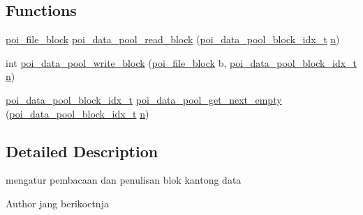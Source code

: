 \subsection*{Functions}
\begin{DoxyCompactItemize}
\item 
\hyperlink{structpoi__file__block}{poi\-\_\-file\-\_\-block} \hyperlink{data-pool-block-manager_8h_ac930ae4a4b3ca65a49d45c7654f15149}{poi\-\_\-data\-\_\-pool\-\_\-read\-\_\-block} (\hyperlink{data-pool-block-manager_8h_a87e19ab8290bcd76be1c7db1e90cc6f6}{poi\-\_\-data\-\_\-pool\-\_\-block\-\_\-idx\-\_\-t} \hyperlink{allocation-table-test_8c_a24010dade8ebab3f87a48022772cd975}{n})
\item 
int \hyperlink{data-pool-block-manager_8h_a10624f1cbc61dd0a8a03aa94d8502567}{poi\-\_\-data\-\_\-pool\-\_\-write\-\_\-block} (\hyperlink{structpoi__file__block}{poi\-\_\-file\-\_\-block} b, \hyperlink{data-pool-block-manager_8h_a87e19ab8290bcd76be1c7db1e90cc6f6}{poi\-\_\-data\-\_\-pool\-\_\-block\-\_\-idx\-\_\-t} \hyperlink{allocation-table-test_8c_a24010dade8ebab3f87a48022772cd975}{n})
\item 
\hyperlink{data-pool-block-manager_8h_a87e19ab8290bcd76be1c7db1e90cc6f6}{poi\-\_\-data\-\_\-pool\-\_\-block\-\_\-idx\-\_\-t} \hyperlink{data-pool-block-manager_8h_ae02f040d4e0f458f0d63751bc09f55b7}{poi\-\_\-data\-\_\-pool\-\_\-get\-\_\-next\-\_\-empty} (\hyperlink{data-pool-block-manager_8h_a87e19ab8290bcd76be1c7db1e90cc6f6}{poi\-\_\-data\-\_\-pool\-\_\-block\-\_\-idx\-\_\-t} \hyperlink{allocation-table-test_8c_a24010dade8ebab3f87a48022772cd975}{n})
\end{DoxyCompactItemize}


\subsection{Detailed Description}
mengatur pembacaan dan penulisan blok kantong data \begin{DoxyAuthor}{Author}
jang berikoetnja 
\end{DoxyAuthor}


